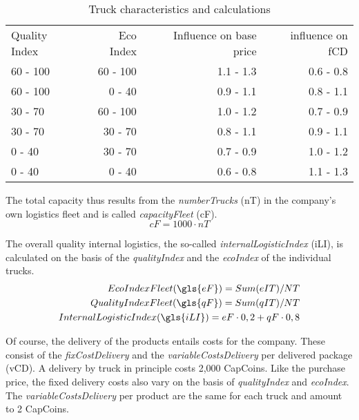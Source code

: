 \begin{table}[ht]
    \centering
    \begin{tabular}{|l|r|r|r|}
    \hline
    Quality Index & Eco Index & Influence on base price & influence on fCD \\
    60 - 100      & 60 - 100   & 1.1 - 1.3   & 0.6 - 0.8       \\
    60 - 100      & 0 - 40     & 0.9 - 1.1   & 0.8 - 1.1       \\
    30 - 70       & 60 - 100   & 1.0 - 1.2   & 0.7 - 0.9       \\
    30 - 70       & 30 - 70    & 0.8 - 1.1   & 0.9 - 1.1       \\
    0 - 40        & 30 - 70    & 0.7 - 0.9   & 1.0 - 1.2       \\
    0 - 40        & 0 - 40     & 0.6 - 0.8   & 1.1 - 1.3       \\
    \hline
    \end{tabular}
    \caption{Truck characteristics and calculations}
    \label{Truck_characteristics}
\end{table}

The total capacity thus results from the \textit{numberTrucks} (\gls{nT}) in the company's own logistics fleet and is called \textit{capacityFleet} (\gls{cF}). 
\begin{equation}
\label{func:capacityFleet}
    cF = 1000 \cdot nT
\end{equation}

The overall quality internal logistics, the so-called \textit{internalLogisticIndex} (\gls{iLI}), is calculated on the basis of the \textit{qualityIndex} and the \textit{ecoIndex} of the individual trucks.
\begin{equation}
\label{func:internalLogisticIndex}
\begin{aligned}
    Eco Index Fleet (\gls{eF}) = Sum (eIT) / NT \\
    Quality Index Fleet (\gls{qF}) = Sum (qIT) / NT \\
    Internal Logistic Index (\gls{iLI}) = eF \cdot 0,2 + qF \cdot 0,8 \\
\end{aligned}
\end{equation}

Of course, the delivery of the products entails costs for the company. These consist of the \textit{fixCostDelivery} and the \textit{variableCostsDelivery} per delivered package (\gls{vCD}). 
A delivery by truck in principle costs 2,000 CapCoins. Like the purchase price, the fixed delivery costs also vary on the basis of \textit{qualityIndex} and \textit{ecoIndex}. The \textit{variableCostsDelivery} per product are the same for each truck and amount to 2 CapCoins.\\

